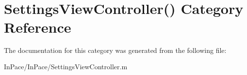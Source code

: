 \hypertarget{categorySettingsViewController_07_08}{\section{Settings\-View\-Controller() Category Reference}
\label{categorySettingsViewController_07_08}
}


The documentation for this category was generated from the following file\-:\begin{DoxyCompactItemize}
\item 
In\-Pace/\-In\-Pace/Settings\-View\-Controller.\-m\end{DoxyCompactItemize}
